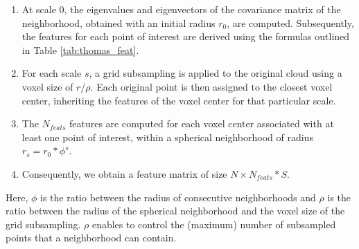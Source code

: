 \documentclass{article}
\begin{document}
\begin{enumerate}
    \item At scale 0, the eigenvalues and eigenvectors of the covariance matrix of the neighborhood, obtained with an initial radius $r_0$, are computed. Subsequently, the features for each point of interest are derived using the formulas outlined in Table \ref{tab:thomas_feat}.
    \item  For each scale $s$, a grid subsampling is applied to the original cloud using a voxel size of $r/\rho$. Each original point is then assigned to the closest voxel center, inheriting the features of the voxel center for that particular scale. 
    \item The $N_{feats}$ features are computed for each voxel center associated with at least one point of interest, within a spherical neighborhood of radius $r_s = r_0 * \phi^s$.
    \item Consequently, we obtain a feature matrix of size $N \times N_{feats} * S$.
\end{enumerate}
Here, $\phi$ is the ratio between the radius of consecutive neighborhoods and $\rho$ is the ratio between the radius of the spherical neighborhood and the voxel size of the grid subsampling. $\rho$ enables to control the (maximum) number of subsampled points that a neighborhood can contain.
\end{document}
